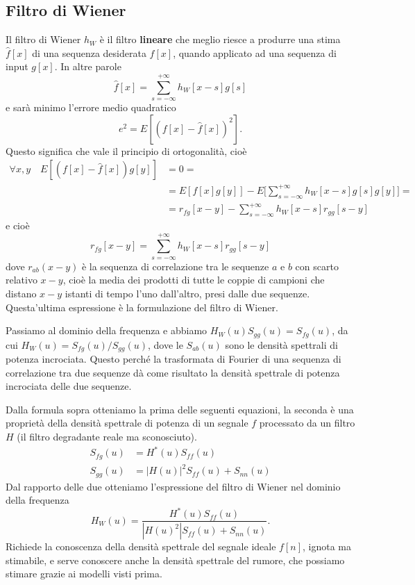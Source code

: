 \documentclass[a4paper,11pt]{article}
\begin{document}
\subsection{Filtro di Wiener}
Il filtro di Wiener $h_W$ è il filtro \textbf{lineare} che meglio riesce a produrre una stima $\hat{f}[x]$ di una sequenza desiderata
$f[x]$, quando applicato ad una sequenza di input $g[x]$.
In altre parole
\[
\hat{f}[x] = \sum_{s=-\infty}^{+\infty} h_W[x-s]g[s]
\]
e sarà minimo l'errore medio quadratico
\[
e^2 = E[(f[x] - \hat{f}[x])^2].
\]
Questo significa che vale il principio di ortogonalità, cioè
\begin{align*}
\forall x,y \quad E[(f[x] - \hat{f}[x])g[y]] &= 0 = \\ &= E[f[x]g[y]] - E\Bigg[\sum_{s=-\infty}^{+\infty}h_W[x-s]g[s]g[y]\Bigg] =\\
&= r_{fg}[x-y] - \sum_{s=-\infty}^{+\infty}h_W[x-s]r_{gg}[s-y]
\end{align*}
e cioè
\[
r_{fg}[x-y] = \sum_{s=-\infty}^{+\infty}h_W[x-s]r_{gg}[s-y]
\]
dove $r_{ab}(x-y)$ è la sequenza di correlazione tra le sequenze $a$ e $b$ con scarto relativo $x-y$, cioè la media dei prodotti di tutte le coppie
di campioni che distano $x-y$ istanti di tempo l'uno dall'altro, presi dalle due sequenze.
Questa'ultima espressione è la formulazione del filtro di Wiener.
\par
Passiamo al dominio della frequenza e abbiamo $H_W(u)S_{gg}(u) = S_{fg}(u)$, da cui $H_W(u) = S_{fg}(u)/S_{gg}(u)$, dove le $S_{ab}(u)$ sono
le densità spettrali di potenza incrociata. Questo perché la trasformata di Fourier di una sequenza di correlazione tra due sequenze dà come risultato
la densità spettrale di potenza incrociata delle due sequenze.
\par
Dalla formula sopra otteniamo la prima delle seguenti equazioni, la seconda è una proprietà della densità spettrale di potenza di un segnale $f$ processato da un filtro $H$
(il filtro degradante reale ma sconosciuto).
\begin{align*}
    S_{fg}(u) &= H^*(u)S_{ff}(u) \\
    S_{gg}(u) &= |H(u)|^2 S_{ff}(u) + S_{nn}(u)
\end{align*}
Dal rapporto delle due otteniamo l'espressione del filtro di Wiener nel dominio della frequenza
\[
H_W(u) = \frac{H^*(u)S_{ff}(u)}{|H(u)^2|S_{ff}(u) + S_{nn}(u)}.
\]
Richiede la conoscenza della densità spettrale del segnale ideale $f[n]$, ignota ma stimabile, e serve conoscere anche la densità spettrale
del rumore, che possiamo stimare grazie ai modelli visti prima.
\end{document}
